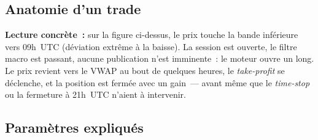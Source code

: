 \documentclass[11pt, a4paper]{scrartcl}
\begin{document}
\subsection{Anatomie d'un trade}

\begin{examplebox}
\textbf{Lecture concrète~:} sur la figure ci-dessus, le prix touche la bande
inférieure vers 09h~UTC (déviation extrême à la baisse). La session est ouverte,
le filtre macro est passant, aucune publication n'est imminente~: le moteur
ouvre un long. Le prix revient vers le VWAP au bout de quelques heures, le
\emph{take-profit} se déclenche, et la position est fermée avec un gain~--- avant
même que le \emph{time-stop} ou la fermeture à 21h~UTC n'aient à intervenir.
\end{examplebox}

\subsection{Paramètres expliqués}
\end{document}
